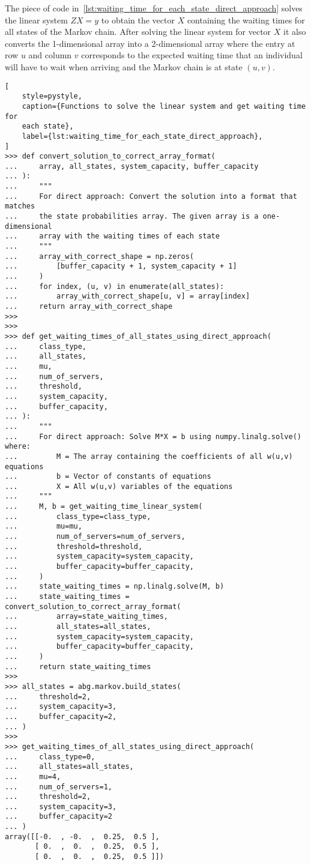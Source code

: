 The piece of code in~\ref{lst:waiting_time_for_each_state_direct_approach}
solves the linear system \(Z X = y\) to obtain the
vector \(X\) containing the waiting times for all states of the Markov chain.
After solving the linear system for vector \(X\) it also converts the
1-dimensional array into a 2-dimensional array where the entry at row \(u\) and
column \(v\) corresponds to the expected waiting time that an individual will
have to wait when arriving and the Markov chain is at state \((u,v)\).

\begin{lstlisting}[
    style=pystyle,
    caption={Functions to solve the linear system and get waiting time for
    each state},
    label={lst:waiting_time_for_each_state_direct_approach},
]
>>> def convert_solution_to_correct_array_format(
...     array, all_states, system_capacity, buffer_capacity
... ):
...     """
...     For direct approach: Convert the solution into a format that matches
...     the state probabilities array. The given array is a one-dimensional
...     array with the waiting times of each state
...     """
...     array_with_correct_shape = np.zeros(
...         [buffer_capacity + 1, system_capacity + 1]
...     )
...     for index, (u, v) in enumerate(all_states):
...         array_with_correct_shape[u, v] = array[index]
...     return array_with_correct_shape
>>>
>>>
>>> def get_waiting_times_of_all_states_using_direct_approach(
...     class_type,
...     all_states,
...     mu,
...     num_of_servers,
...     threshold,
...     system_capacity,
...     buffer_capacity,
... ):
...     """
...     For direct approach: Solve M*X = b using numpy.linalg.solve() where:
...         M = The array containing the coefficients of all w(u,v) equations
...         b = Vector of constants of equations
...         X = All w(u,v) variables of the equations
...     """
...     M, b = get_waiting_time_linear_system(
...         class_type=class_type,
...         mu=mu,
...         num_of_servers=num_of_servers,
...         threshold=threshold,
...         system_capacity=system_capacity,
...         buffer_capacity=buffer_capacity,
...     )
...     state_waiting_times = np.linalg.solve(M, b)
...     state_waiting_times = convert_solution_to_correct_array_format(
...         array=state_waiting_times,
...         all_states=all_states,
...         system_capacity=system_capacity,
...         buffer_capacity=buffer_capacity,
...     )
...     return state_waiting_times
>>>
>>> all_states = abg.markov.build_states(
...     threshold=2,
...     system_capacity=3,
...     buffer_capacity=2,
... )
>>>
>>> get_waiting_times_of_all_states_using_direct_approach(
...     class_type=0,
...     all_states=all_states,
...     mu=4,
...     num_of_servers=1,
...     threshold=2,
...     system_capacity=3,
...     buffer_capacity=2
... )
array([[-0.  , -0.  ,  0.25,  0.5 ],
       [ 0.  ,  0.  ,  0.25,  0.5 ],
       [ 0.  ,  0.  ,  0.25,  0.5 ]])

\end{lstlisting}

